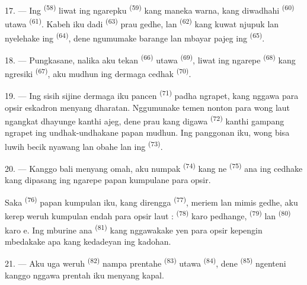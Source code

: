 17. --- Ing  \textsuperscript{(58)} liwat ing ngarepku
 \textsuperscript{(59)} kang maneka warna, kang
diwadhahi  \textsuperscript{(60)} utawa  \textsuperscript{(61)}. Kabeh iku dadi 
\textsuperscript{(63)} prau gedhe, lan 
\textsuperscript{(62)} kang kuwat njupuk lan nyelehake ing
 \textsuperscript{(64)}, dene 
ngumumake barange lan mbayar pajeg ing 
\textsuperscript{(65)}.

18. --- Pungkasane, nalika aku tekan 
\textsuperscript{(66)} utawa  \textsuperscript{(69)},
liwat ing ngarepe  \textsuperscript{(68)} kang
ngresiki  \textsuperscript{(67)}, aku mudhun ing dermaga
cedhak  \textsuperscript{(70)}.

19. --- Ing sisih sijine dermaga iku pancen 
\textsuperscript{(71)} padha ngrapet, kang nggawa para opsir eskadron
menyang dharatan. Nggumunake temen nonton para wong laut ngangkat
dhayunge kanthi ajeg, dene prau kang digawa 
\textsuperscript{(72)} kanthi gampang ngrapet ing undhak-undhakane papan
mudhun. Ing panggonan iku, wong bisa luwih becik nyawang
 lan obahe  lan  ing
 \textsuperscript{(73)}.

\VUsaut{3.0mm}
\VUsaut{3.0mm}

20. --- Kanggo bali menyang omah, aku numpak 
\textsuperscript{(74)} kang ne \textsuperscript{(75)} ana
ing cedhake  kang dipasang ing ngarepe papan kumpulane
para opsir.

Saka  \textsuperscript{(76)} papan kumpulan iku, kang
direngga  \textsuperscript{(77)}, meriem lan mimis
gedhe, aku kerep weruh kumpulan endah para opsir laut :
 \textsuperscript{(78)} karo pedhange,  \textsuperscript{(79)} lan 
\textsuperscript{(80)} karo e. Ing mburine ana
 \textsuperscript{(81)} kang nggawakake 
yen para opsir kepengin mbedakake apa kang kedadeyan ing kadohan.

21. --- Aku uga weruh  \textsuperscript{(82)} nampa
prentahe  \textsuperscript{(83)} utawa
 \textsuperscript{(84)}, dene 
\textsuperscript{(85)} ngenteni kanggo nggawa prentah iku menyang kapal.

